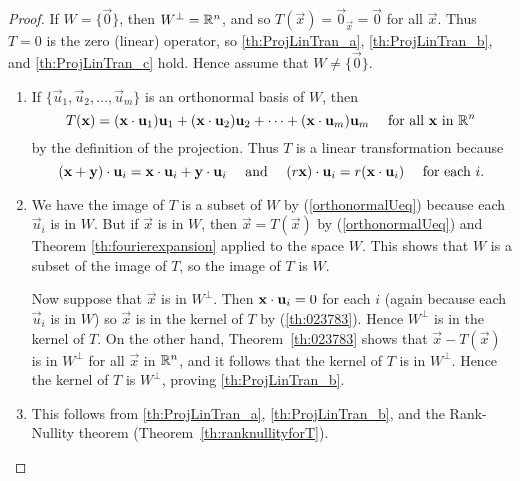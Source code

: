 \documentclass{ximera}
\begin{document}
\begin{proof}
If $W = \{\vec{0}\}$, then $W^\perp = \mathbb{R}^n$, and so $T(\vec{x}) = \vec{0}_\vec{x} = \vec{0}$ for all $\vec{x}$. Thus $T = 0$ is the zero (linear) operator, so \ref{th:ProjLinTran_a}, \ref{th:ProjLinTran_b}, and \ref{th:ProjLinTran_c} hold. Hence assume that $W \neq \{\vec{0}\}$.

\begin{enumerate}
\item If $\{\vec{u}_{1}, \vec{u}_{2}, \dots, \vec{u}_{m}\}$ is an orthonormal basis of $W$, then
\begin{equation}\label{orthonormalUeq}
T(\mathbf{x}) = (\mathbf{x} \cdot \mathbf{u}_{1})\mathbf{u}_{1} + (\mathbf{x} \cdot \mathbf{u}_{2})\mathbf{u}_{2} + \dots + (\mathbf{x} \cdot \mathbf{u}_{m})\mathbf{u}_{m} \quad \mbox{ for all }\mathbf{x} \mbox{ in } \mathbb{R}^n
\end{equation}
by the definition of the projection. Thus $T$ is a linear transformation because
\begin{equation*}
(\mathbf{x} + \mathbf{y}) \cdot \mathbf{u}_{i} = \mathbf{x} \cdot \mathbf{u}_{i} + \mathbf{y} \cdot \mathbf{u}_{i} \quad \mbox{ and } \quad (r\mathbf{x}) \cdot \mathbf{u}_{i} = r(\mathbf{x} \cdot \mathbf{u}_{i}) \quad \mbox{ for each } i.
\end{equation*}

\item %
We have the image of $T$ is a subset of $W$ by (\ref{orthonormalUeq}) because each $\vec{u}_{i}$ is in $W$. But if $\vec{x}$ is in $W$, then $\vec{x} = T(\vec{x})$ by (\ref{orthonormalUeq}) and Theorem \ref{th:fourierexpansion} applied to the space $W$. This shows that $W$ is a subset of the image of $T$, so the image of $T$ is $W$.

Now suppose that $\vec{x}$ is in $W^\perp$. Then $\mathbf{x} \cdot \mathbf{u}_{i} = 0$ for each $i$ (again because each $\vec{u}_{i}$ is in $W$) so $\vec{x}$ is in the kernel of $T$ by (\ref{th:023783}). Hence $W^\perp$ is in the kernel of $T$. On the other hand, Theorem~\ref{th:023783} shows that $\vec{x} - T(\vec{x})$ is in $W^\perp$ for all $\vec{x}$ in $\mathbb{R}^n$, and it follows that the kernel of $T$ is in $W^\perp$. Hence the kernel of $T$ is $W^\perp$, proving \ref{th:ProjLinTran_b}.

\item This follows from \ref{th:ProjLinTran_a}, \ref{th:ProjLinTran_b}, and the Rank-Nullity theorem (Theorem~\ref{th:ranknullityforT}).
\end{enumerate}
\end{proof}
\end{document}
